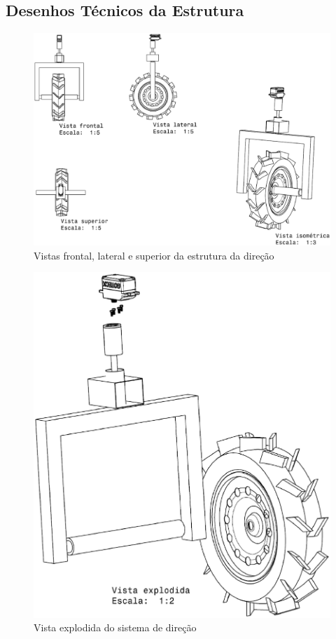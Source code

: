 \begin{apendicesenv}
\chapter{Desenhos Técnicos da Estrutura}

\begin{figure}[!htbp]
	\centering
	\includegraphics[width=\textwidth]{figuras/dt_direcao1.eps}
	\caption{Vistas frontal, lateral e superior da estrutura da direção}
\end{figure}

\begin{figure}[!htbp]
	\centering
	\includegraphics[width=\textwidth]{figuras/dt_direcao2.eps}
	\caption{Vista explodida do sistema de direção}
\end{figure}


\end{apendicesenv}
